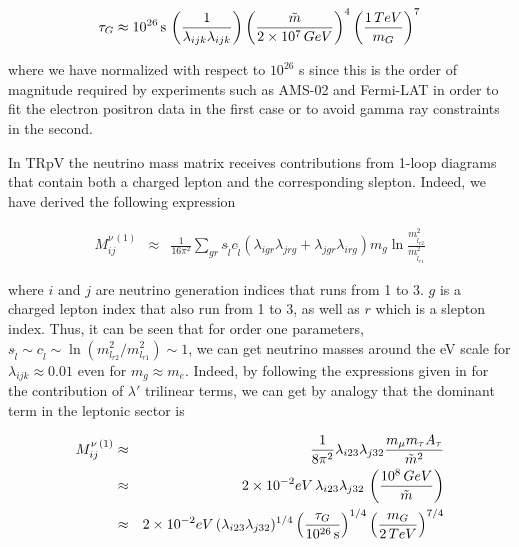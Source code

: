 \documentclass[a4paper,11pt]{article}
\begin{document}
\begin{equation}
\tau_{G} \approx 10^{26}\,\text{s}\,\left(\frac{1}{\lambda_{ijk}\lambda_{ijk}}\right)\left(\frac{\tilde{m}}{2\times 10^{7}\mbox{\,GeV}}\right)^{4}\left(\frac{1\,\mbox{TeV}}{m_{G}}\right)^{7}\label{eq:GravLifeTime}
\end{equation}


\noindent where we have normalized with respect to $10^{26}$ s
since this is the order of magnitude required by experiments such
as AMS-02 and Fermi-LAT in order to fit the electron positron data
in the first case or to avoid gamma ray constraints in the second.



In TRpV the neutrino mass matrix receives contributions from
1-loop diagrams that contain both a charged lepton and the corresponding
slepton. Indeed, we have derived the following expression

\begin{eqnarray*}
M_{ij}^{\nu\,(1)} & \approx & \frac{1}{16\pi^{2}}\sum_{gr}s_{\tilde{l}}c_{\tilde{l}}(\lambda_{igr}\lambda_{jrg}+\lambda_{jgr}\lambda_{irg})m_{g}\ln\frac{m_{\tilde{l}_{r2}}^{2}}{m_{\tilde{l}_{r1}}^{2}}
\end{eqnarray*}

\noindent where $i$ and $j$ are neutrino generation indices that
runs from 1 to 3. $g$ is a charged lepton index that also run from
1 to 3, as well as $r$ which is a slepton index. Thus, it can be
seen that for order one parameters, $s_{\tilde{l}} \sim c_{\tilde{l}} \sim \ln(m_{l_{r2}}^{2}/m_{l_{r1}}^{2})\sim 1$, we can get neutrino masses around the eV scale for $\lambda_{ijk}\approx0.01$
even for $m_{g}\approx m_{e}$. Indeed, by following the expressions given in \cite{Chun:2004mu} for the
contribution of $\lambda'$ trilinear terms, we can get by analogy
that the dominant term in the leptonic sector is 

\begin{eqnarray*}
M_{ij}^{\nu\,(1)} & \approx & \frac{1}{8\pi^{2}}\lambda_{i23}\lambda_{j32}\frac{m_{\mu}m_{\tau}A_{\tau}}{\tilde{m}^{2}}\\
 & \approx & 2\times10^{-2}\mbox{eV}\,\lambda_{i23}\lambda_{j32}\,\left(\frac{10^{8}\mbox{\,GeV}}{\tilde{m}}\right)\\
 & \approx & 2 \times10^{-2}\mbox{eV}\,(\lambda_{i23}\lambda_{j32})^{1/4}\left(\frac{\tau_{G}}{10^{\text{26}}\,\text{s}}\right)^{1/4}\left(\frac{m_{G}}{2\,\mbox{TeV}}\right)^{7/4}
\end{eqnarray*}
\end{document}
